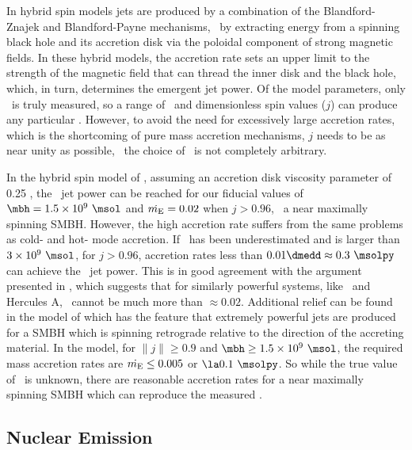 \documentclass[apjpt4]{aastex}
\begin{document}
In hybrid spin models \citep[\eg][]{1999ApJ...522..753M,
  2001ApJ...548L...9M, 2006ApJ...651.1023R, 2007MNRAS.377.1652N,
  2009MNRAS.397.1302B, gesspin} jets are produced by a combination of
the Blandford-Znajek \citep{bz} and Blandford-Payne \citep{bp}
mechanisms, \ie\ by extracting energy from a spinning black hole and
its accretion disk via the poloidal component of strong magnetic
fields. In these hybrid models, the accretion rate sets an upper limit
to the strength of the magnetic field that can thread the inner disk
and the black hole, which, in turn, determines the emergent jet
power. Of the model parameters, only \pjet\ is truly measured, so a
range of \dme\ and dimensionless spin values ($j$) can produce any
particular \pjet. However, to avoid the need for excessively large
accretion rates, which is the shortcoming of pure mass accretion
mechanisms, $j$ needs to be as near unity as possible, \ie\ the choice
of \dme\ is not completely arbitrary.

In the hybrid spin model of \citet{2007MNRAS.377.1652N}, assuming an
accretion disk viscosity parameter of 0.25
\citep{1999ApJ...520..298Q}, the \rbs\ jet power can be reached for
our fiducial values of $\mbh = 1.5 \times 10^9 ~\msol$ and $\dot{m_{\rm{E}}} =
0.02$ when $j > 0.96$, \ie\ a near maximally spinning SMBH. However,
the high accretion rate suffers from the same problems as cold- and
hot- mode accretion. If \mbh\ has been underestimated and is larger
than $3 \times 10^9 ~\msol$, for $j > 0.96$, accretion rates less than
$0.01 \dmedd \approx 0.3 ~\msolpy$ can achieve the \rbs\ jet
power. This is in good agreement with the argument presented in
\citet{minaspin}, which suggests that for similarly powerful systems,
like \ms\ and Hercules A, \dme\ cannot be much more than $\approx
0.02$. Additional relief can be found in the model of \citet{gesspin}
which has the feature that extremely powerful jets are produced for a
SMBH which is spinning retrograde relative to the direction of the
accreting material. In the \citet{gesspin} model, for $\|j\| \ge 0.9$
and $\mbh \ge 1.5 \times 10^9 ~\msol$, the required mass accretion
rates are $\dot{m_{\rm{E}}} \le 0.005$ or $\la 0.1 ~\msolpy$. So while the true
value of \dme\ is unknown, there are reasonable accretion rates for a
near maximally spinning SMBH which can reproduce the measured \pjet.

\subsection{Nuclear Emission}
\label{sec:nuc}
\end{document}
